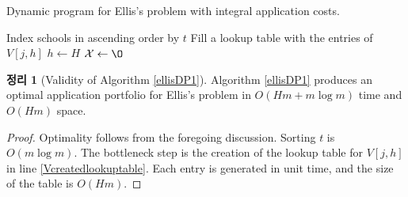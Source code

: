 \documentclass[12pt]{article} %
\newtheorem{theorem}{Theorem}
\theoremstyle{definition}
\newtheorem{theorem}{정리}
\theoremstyle{definition}
\begin{document}
\begin{algorithm}[H] 
\caption{Dynamic program for Ellis's problem with integral application costs.} \label{ellisDP1}
Index schools in ascending order by $t$\;
Fill a lookup table with the entries of $V[j, h]$\; \label{Vcreatedlookuptable}
$h \gets H$\;
$\mathcal{X} \gets \O$\;
\end{algorithm}

\begin{theorem}[Validity of Algorithm \ref{ellisDP1}]
Algorithm \ref{ellisDP1} produces an optimal application portfolio for Ellis's problem in $O(H m + m \log m)$ time and $O(H m)$ space.
\end{theorem}

\begin{proof}
Optimality follows from the foregoing discussion. Sorting $t$ is $O(m \log m)$. The bottleneck step is the creation of the lookup table for $V[j, h]$ in line \ref{Vcreatedlookuptable}. Each entry is generated in unit time, and the size of the table is $O(Hm)$. 
\end{proof}
\end{document}
